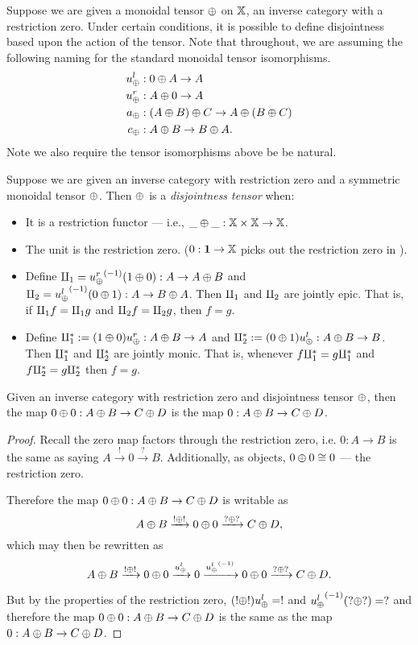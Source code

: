 Suppose we are given a monoidal tensor $\oplus$ on $\mathbb{X}$, an inverse category with a restriction zero.
Under certain conditions, it is possible to define disjointness based upon the action of the
tensor. Note that throughout, we are assuming the following naming for the standard monoidal tensor
isomorphisms.
\begin{align*}
   u_{\oplus}^l &: 0 \oplus A \to A\\
   u_{\oplus}^r &: A \oplus 0 \to A\\
   a_\oplus &: (A \oplus B) \oplus C \to A \oplus (B \oplus C) \\
   c_\oplus &: A \oplus B \to B \oplus A.
 \end{align*}
Note we also require the tensor isomorphisms above be be natural.

\begin{definition}\label{def:disjointness_tensor}
  Suppose we are given an inverse category \X with restriction zero and a symmetric monoidal tensor
  $\oplus$. Then $\oplus$ is a \emph{disjointness tensor} when:
  \begin{itemize}
    \item It is a restriction functor --- i.e., $\_ \oplus \_ : \mathbb{X} \times \mathbb{X} \to \mathbb{X}$.
    \item The unit is the restriction zero. ($0 : \boldsymbol{1}\to \mathbb{X}$ picks out the restriction
    zero in \X).
    \item Define $\amalg_{1} = {u_{\oplus}^r}^{(-1)}(1\oplus0):A\to A\oplus B$ and $\amalg_{2} = {u_{\oplus}^l}^{(-1)}(0\oplus1): A\to B\oplus A$. Then
      $\amalg_{1}$ and $\amalg_{2}$ are jointly epic. That is, if $\amalg_{1} f = \amalg_{1} g$ and $\amalg_{2} f = \amalg_{2} g$, then
      $f = g$.
    \item Define $\amalg_{1}^{*} := (1\oplus0)u_{\oplus}^r: A\oplus B \to A$ and $\amalg_{2}^{*} := (0\oplus1)u_{\oplus}^l:A\oplus B \to B$. Then
      $\amalg_{1}^{*}$  and $\amalg_{2}^{*}$ are jointly monic. That is, whenever $f\amalg_{1}^{*} = g \amalg_{1}^{*}$ and
      $f\amalg_{2}^{*} = g\amalg_{2}^{*}$ then $f = g$.
  \end{itemize}

\end{definition}

\begin{lemma}\label{lem:zero_plus_zero_is_zero}
  Given an inverse category \X with restriction zero and disjointness tensor $\oplus$, then the map
  $0\oplus0: A\oplus B \to C\oplus D$ is the map $0: A\oplus B \to C\oplus D$.
\end{lemma}
\begin{proof}
  Recall the zero map factors through the restriction zero, i.e. $0:A \to B$ is the same as
  saying $A\xrightarrow{!} 0 \xrightarrow{?}B$. Additionally, as objects, $0\oplus0 \cong 0$ ---
  the restriction zero.

  Therefore the map $0\oplus0: A\oplus B \to C\oplus D$ is writable as
  \[
    A\oplus B \xrightarrow{!\oplus!}0\oplus0  \xrightarrow{?\oplus?} C\oplus D,
  \]
  which may then be rewritten as
  \[
    A\oplus B \xrightarrow{!\oplus!}0\oplus0 \xrightarrow{u_{\oplus}^l} 0
      \xrightarrow{{u_{\oplus}^l}^{(-1)}} 0\oplus0 \xrightarrow{?\oplus?} C\oplus D.
  \]

  But by the properties of the restriction zero, $(!\oplus!) u_{\oplus}^l = !$ and ${u_{\oplus}^l}^{(-1)}(?\oplus?) = ?$
  and therefore the map $0\oplus0: A\oplus B \to C\oplus D$ is the same as the map $0: A\oplus B \to C\oplus D$.
\end{proof}


